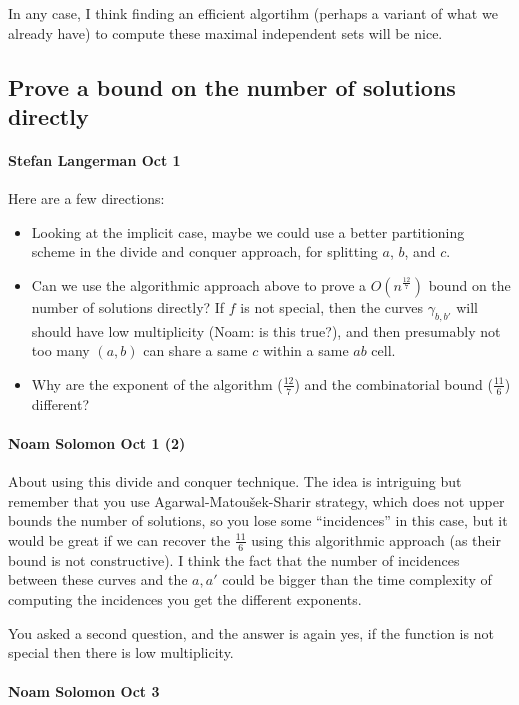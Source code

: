 In any case, I think finding an efficient algortihm (perhaps a variant of
what we already have) to compute these maximal independent sets will be
nice.


\subsection{Prove a bound on the number of solutions directly}

\paragraph{Stefan Langerman Oct 1}

Here are a few directions:
\begin{itemize}
	\item Looking at the implicit case, maybe we could use a better
		partitioning scheme in the divide and conquer approach, for splitting
		$a$, $b$, and $c$.
	\item Can we use the algorithmic approach above to prove a \(O(n^\frac{12}{7})\) bound
		on the number of solutions directly? If $f$ is not special, then the
		curves \(\gamma_{b,b'}\) will should have low multiplicity (Noam: is this
		true?), and then presumably not too many $(a,b)$ can share a same $c$
		within a same $ab$ cell.
	\item Why are the exponent of the algorithm ($\frac{12}{7}$) and the combinatorial
		bound ($\frac{11}{6}$) different?
\end{itemize}


\paragraph{Noam Solomon Oct 1 (2)}
About using this divide and
conquer technique.
The idea is intriguing but remember that you use Agarwal-Matou\v{s}ek-Sharir
strategy, which does not upper bounds the number of solutions, so you lose
some ``incidences'' in this case, but it would be great if we can recover
the $\frac{11}{6}$ using this algorithmic approach (as their bound is not
constructive).
I think the fact that the number of incidences between these curves and the
$a,a'$ could be bigger than the time complexity of computing the incidences
you get the different exponents.

You asked a second question, and the answer is again yes, if the function
is not special then there is low multiplicity.


\paragraph{Noam Solomon Oct 3}


